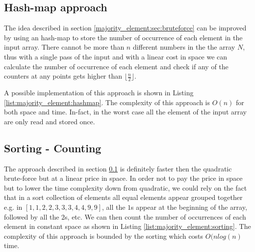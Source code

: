 


\subsection{Hash-map approach}
\label{majority_element:sec:hashmap}

The idea described in section \ref{majority_element:sec:bruteforce} can be improved by using an hash-map to store the number of occurrence of each element in the input array. There cannot be more than $n$ different numbers in the the array $N$, thus with a single pass of the input and with a linear cost in space we can calculate the number of occurrence of each element and check if any of the counters at any points gets higher than $\lfloor \frac{n}{2} \rfloor$.

A possible implementation of this approach is shown in Listing \ref{list:majority_element:hashmap}.
The complexity of this approach is $O(n)$ for both space and time. In-fact, in the worst case all the element of the input array are only read and stored once.



\subsection{Sorting - Counting}
\label{majority_element:sec:sorting}
The approach described in section \ref{majority_element:sec:hashmap} is definitely faster then the quadratic brute-force but at a linear price in space. In order not to pay the price in space but to lower the time complexity down from quadratic, we could rely on the fact that in a sort collection of elements all equal elements appear grouped together e.g. in $[1,1,2,2,3,3,3,4,4,9,9]$, all the $1$s appear at the beginning of the array, followed by all the $2$s, etc. We can then count the number of occurrences of each element in constant space as shown in Listing \ref{list:majority_element:sorting}. The complexity of this approach is bounded by the sorting which costs $O(nlog(n)$ time.



